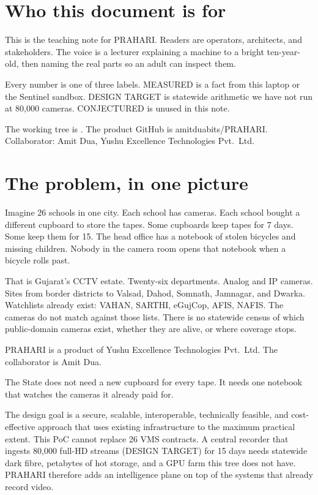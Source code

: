 \documentclass[listings]{csf301-notes}
\begin{document}
\notestitle

\section{Who this document is for}
This is the teaching note for PRAHARI. Readers are operators, architects, and stakeholders. The voice is a lecturer explaining a machine to a bright ten-year-old, then naming the real parts so an adult can inspect them.

Every number is one of three labels. MEASURED is a fact from this laptop or the Sentinel sandbox. DESIGN TARGET is statewide arithmetic we have not run at 80{,}000 cameras. CONJECTURED is unused in this note.

The working tree is . The product GitHub is amitduabits/PRAHARI. Collaborator: Amit Dua, Yushu Excellence Technologies Pvt.\ Ltd.

\section{The problem, in one picture}
Imagine 26 schools in one city. Each school has cameras. Each school bought a different cupboard to store the tapes. Some cupboards keep tapes for 7 days. Some keep them for 15. The head office has a notebook of stolen bicycles and missing children. Nobody in the camera room opens that notebook when a bicycle rolls past.

That is Gujarat's CCTV estate. Twenty-six departments. Analog and IP cameras. Sites from border districts to Valsad, Dahod, Somnath, Jamnagar, and Dwarka. Watchlists already exist: VAHAN, SARTHI, eGujCop, AFIS, NAFIS. The cameras do not match against those lists. There is no statewide census of which public-domain cameras exist, whether they are alive, or where coverage stops.

PRAHARI is a product of Yushu Excellence Technologies Pvt.\ Ltd. The collaborator is Amit Dua.

\begin{keyidea}
The State does not need a new cupboard for every tape. It needs one notebook that watches the cameras it already paid for.
\end{keyidea}

The design goal is a secure, scalable, interoperable, technically feasible, and cost-effective approach that uses existing infrastructure to the maximum practical extent. This PoC cannot replace 26 VMS contracts. A central recorder that ingests 80{,}000 full-HD streams (DESIGN TARGET) for 15 days needs statewide dark fibre, petabytes of hot storage, and a GPU farm this tree does not have. PRAHARI therefore adds an intelligence plane on top of the systems that already record video.
\end{document}
